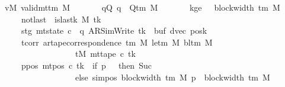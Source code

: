 \begin{isabellebody}
\ \ \ vM{\isacharcolon}{\kern0pt}\ {\isachardoublequoteopen}valid{\isacharunderscore}{\kern0pt}mttm\ M{\isachardoublequoteclose}\isanewline
\ \ \ \ \ \ \ qQ{\isacharcolon}{\kern0pt}\ {\isachardoublequoteopen}q\ {\isasymin}\ Q{\isacharunderscore}{\kern0pt}tm\ M{\isachardoublequoteclose}\isanewline
\ \ \ \ \ \ \ kge{}{\isacharcolon}{\kern0pt}\ {\isachardoublequoteopen}{}\ {\isasymle}\ block{\isacharunderscore}{\kern0pt}width\ {\isacharparenleft}{\kern0pt}{\isasymGamma}{\isacharunderscore}{\kern0pt}tm\ M{\isacharparenright}{\kern0pt}{\isachardoublequoteclose}\isanewline
\ \ \ \ \ \ \ notlast{\isacharcolon}{\kern0pt}\ {\isachardoublequoteopen}{\isasymnot}\ is{\isacharunderscore}{\kern0pt}last{\isacharunderscore}{\kern0pt}k\ M\ tk{\isachardoublequoteclose}\isanewline
\ \ \ \ \ \ \ stg{\isacharcolon}{\kern0pt}\ {\isachardoublequoteopen}mt{\isacharunderscore}{\kern0pt}state\ c{\isacharprime}{\kern0pt}\ {\isacharequal}{\kern0pt}\ {\isacharparenleft}{\kern0pt}q{\isacharcomma}{\kern0pt}\ AR{\isacharunderscore}{\kern0pt}SimWrite{\isacharcomma}{\kern0pt}\ tk{\isacharcomma}{\kern0pt}\ {}{\isacharcomma}{\kern0pt}\ buf{\isacharcomma}{\kern0pt}\ dvec{\isacharcomma}{\kern0pt}\ posk{\isacharparenright}{\kern0pt}{\isachardoublequoteclose}\isanewline
\ \ \ \ \ \ \ tcorr{\isacharcolon}{\kern0pt}\ {\isachardoublequoteopen}ar{\isacharunderscore}{\kern0pt}tape{\isacharunderscore}{\kern0pt}correspondence\ {\isacharparenleft}{\kern0pt}{\isasymGamma}{\isacharunderscore}{\kern0pt}tm\ M{\isacharparenright}{\kern0pt}\ {\isacharparenleft}{\kern0pt}le{\isacharunderscore}{\kern0pt}tm\ M{\isacharparenright}{\kern0pt}\ {\isacharparenleft}{\kern0pt}bl{\isacharunderscore}{\kern0pt}tm\ M{\isacharparenright}{\kern0pt}\isanewline
\ \ \ \ \ \ \ \ \ \ \ \ \ \ \ \ \ \ \ \ tM\ {\isacharparenleft}{\kern0pt}mt{\isacharunderscore}{\kern0pt}tape\ c{\isacharprime}{\kern0pt}\ tk{\isacharparenright}{\kern0pt}{\isachardoublequoteclose}\isanewline
\ \ \ \ \ \ \ ppos{\isacharcolon}{\kern0pt}\ {\isachardoublequoteopen}mt{\isacharunderscore}{\kern0pt}pos\ c{\isacharprime}{\kern0pt}\ tk\ {\isacharequal}{\kern0pt}\ {\isacharparenleft}{\kern0pt}if\ p\ {\isacharequal}{\kern0pt}\ {}\ then\ Suc\ {}\isanewline
\ \ \ \ \ \ \ \ \ \ \ \ \ \ \ \ \ \ \ \ else\ sim{\isacharunderscore}{\kern0pt}pos\ {\isacharparenleft}{\kern0pt}block{\isacharunderscore}{\kern0pt}width\ {\isacharparenleft}{\kern0pt}{\isasymGamma}{\isacharunderscore}{\kern0pt}tm\ M{\isacharparenright}{\kern0pt}{\isacharparenright}{\kern0pt}\ p\ {\isacharplus}{\kern0pt}\ block{\isacharunderscore}{\kern0pt}width\ {\isacharparenleft}{\kern0pt}{\isasymGamma}{\isacharunderscore}{\kern0pt}tm\ M{\isacharparenright}{\kern0pt}{\isacharparenright}{\kern0pt}{\isachardoublequoteclose}\isanewline

\end{isabellebody}
